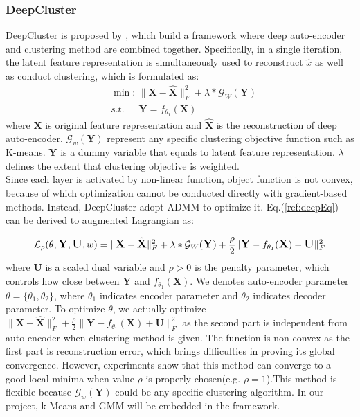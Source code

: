 \documentclass[12pt]{article}
\begin{document}
\subsubsection{DeepCluster}
DeepCluster is proposed by \cite{tian2017deepcluster}, which build a framework where deep auto-encoder and clustering method are combined together. Specifically, in a single iteration, the latent feature representation is simultaneously used to reconstruct $\hat{x}$ as well as  conduct clustering, which is formulated as:
\begin{equation}
\begin{split}
&\min: \,\|{\textbf{X}}-\hat{\textbf{X}}\|_F^2+\lambda*{\mathcal{G}}_W(\textbf{Y}) \\
&s.t.  \,\,\,\,\,\,\,\,\, \textbf{Y}=f_{\theta_1}(\textbf{X})
\end{split}
\label{ref:deepEq}
\end{equation}
where $\textbf{X}$ is original feature representation and $\hat{\textbf{X}}$ is the reconstruction of deep auto-encoder. $\mathcal{G}_w(\textbf{Y})$ represent any specific clustering objective function such as K-means. $\textbf{Y}$ is a dummy variable that equals to latent feature representation. $\lambda$ defines the extent that clustering objective is weighted. \\
Since each layer is activated by non-linear function, object function is not convex, because of which optimization cannot be conducted directly with gradient-based methods. Instead, DeepCluster adopt ADMM to optimize it. Eq.(\ref{ref:deepEq}) can be derived to augmented Lagrangian as:

\begin{equation}
\large
  \mathcal{L}_\rho(\theta,\textbf{Y},\textbf{U},w)=\|\textbf{X}-\hat{\textbf{X}}\|^2_F+\lambda*\mathcal{G}_W(\textbf{Y})+\frac{\rho}{2}\|\textbf{Y}-f_{\theta_1}(\textbf{X})+\textbf{U}\|^2_F
\end{equation}
where $\textbf{U}$ is a scaled dual variable and $\rho > 0$ is the penalty parameter, which controls how close between $\textbf{Y}$ and $f_{\theta_1} (\textbf{X})$. We denotes auto-encoder parameter $\theta=\{\theta_1,\theta_2\}$, where $\theta_1$ indicates encoder parameter and $\theta_2$ indicates decoder parameter. To optimize $\theta$, we actually optimize $\|\textbf{X}-\hat{\textbf{X}}\|^2_F+\frac{\rho}{2}\|\textbf{Y}-f_{\theta_1}(\textbf{X})+\textbf{U}\|^2_F$ as the second part is independent from auto-encoder when clustering method is given. The function is non-convex as the first part is reconstruction error, which brings difficulties in proving its global convergence. However, experiments show that this method can converge to a good local minima when value $\rho$ is properly chosen(e.g.  $\rho=1$)\cite{tian2017deepcluster}.This method is flexible because $\mathcal{G}_w(\textbf{Y})$ could be any specific clustering algorithm. In our project, k-Means and GMM will be embedded in the framework. 
\end{document}
